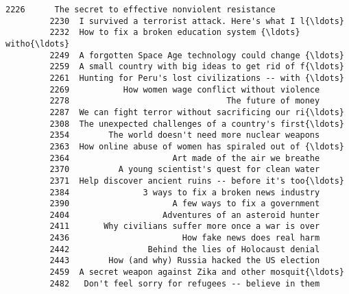 \documentclass[11pt]{article}
\begin{document}
\begin{Verbatim}[commandchars=\\\{\}]
         2226      The secret to effective nonviolent resistance   
         2230  I survived a terrorist attack. Here's what I l{\ldots}   
         2232  How to fix a broken education system {\ldots} witho{\ldots}   
         2249  A forgotten Space Age technology could change {\ldots}   
         2259  A small country with big ideas to get rid of f{\ldots}   
         2261  Hunting for Peru's lost civilizations -- with {\ldots}   
         2269           How women wage conflict without violence   
         2278                                The future of money   
         2287  We can fight terror without sacrificing our ri{\ldots}   
         2308  The unexpected challenges of a country's first{\ldots}   
         2354        The world doesn't need more nuclear weapons   
         2363  How online abuse of women has spiraled out of {\ldots}   
         2364                     Art made of the air we breathe   
         2370          A young scientist's quest for clean water   
         2371  Help discover ancient ruins -- before it's too{\ldots}   
         2384               3 ways to fix a broken news industry   
         2390                     A few ways to fix a government   
         2404                   Adventures of an asteroid hunter   
         2411       Why civilians suffer more once a war is over   
         2436                       How fake news does real harm   
         2442                Behind the lies of Holocaust denial   
         2443        How (and why) Russia hacked the US election   
         2459  A secret weapon against Zika and other mosquit{\ldots}   
         2482   Don't feel sorry for refugees -- believe in them   
         

\end{Verbatim}
\end{document}
